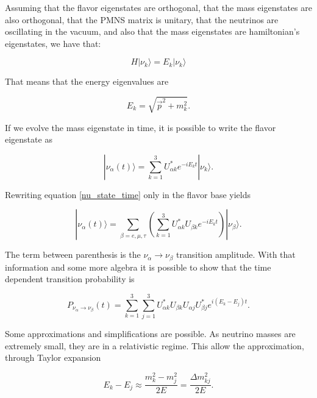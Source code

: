 Assuming that the flavor eigenstates are orthogonal, that the mass eigenstates are also orthogonal, that the PMNS matrix is unitary, that the neutrinos are oscillating in the vacuum, and also that the mass eigenstates are hamiltonian's eigenstates, we have that:

\begin{equation}
	H|\nu_k \rangle = E_k |\nu_k \rangle
	\label{nu_schrodinger}
\end{equation}
 
That means that the energy eigenvalues are
 
\begin{equation}
	E_k = \sqrt{\vec{p}^2 + m_k^2}.
	\label{nu_energy}
\end{equation}
 
If we evolve the mass eigenstate in time, it is possible to write the flavor eigenstate as
 
\begin{equation}
	|\nu_\alpha (t) \rangle = \sum_{k=1}^3 U^*_{\alpha k} e^{-iE_kt}|\nu_k \rangle.
	\label{nu_state_time}
\end{equation}
 
Rewriting equation \ref{nu_state_time} only in the flavor base yields 
 
\begin{equation}
	|\nu_\alpha (t)\rangle = \sum_{\beta = e, \mu, \tau} \left( \sum_{k=1}^3 U^*_{\alpha k} U_{\beta k} e^{-iE_kt} \right) |\nu_\beta \rangle.
	\label{nu_state_time_2}
\end{equation}
 
The term between parenthesis is the $\nu_\alpha \rightarrow \nu_\beta$ transition amplitude. With that information and some more algebra it is possible to show that the time dependent transition probability is
 
\begin{equation}
	P_{\nu_\alpha \rightarrow \nu_\beta}(t) = \sum_{k=1}^3 \sum_{j=1}^3 U^*_{\alpha k} U_{\beta k} U_{\alpha j} U^*_{\beta j} e^{i(E_k - E_j)t}.
	\label{transition_probability}
\end{equation}
 
Some approximations and simplifications are possible. As neutrino masses are extremely small, they are in a relativistic regime. This allow the approximation, through Taylor expansion 
 
\begin{equation}
	E_k - E_j \approx \frac{m^2_k - m^2_j}{2E} = \frac{\Delta m^2_{kj}}{2E}.
	\label{nu_Ej-Ek}
\end{equation}
 
